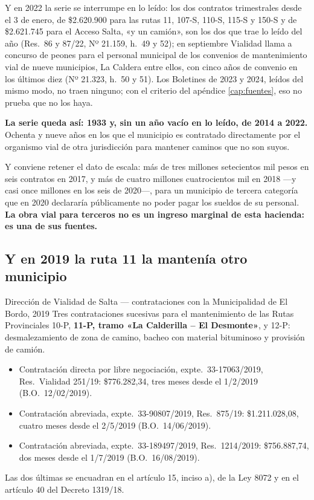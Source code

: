 Y en 2022 la serie se interrumpe en lo leído: los dos contratos trimestrales desde el 3 de enero, de \$2.620.900 para las rutas 11, 107-S, 110-S, 115-S y 150-S y de \$2.621.745 para el Acceso Salta, «y un camión», son los dos que trae lo leído del año (Res.\ 86 y 87/22, Nº 21.159, h.\ 49 y 52); en septiembre Vialidad llama a concurso de peones para el personal municipal de los convenios de mantenimiento vial de nueve municipios, La Caldera entre ellos, con cinco años de convenio en los últimos diez (Nº 21.323, h.\ 50 y 51). Los Boletines de 2023 y 2024, leídos del mismo modo, no traen ninguno; con el criterio del apéndice \ref{cap:fuentes}, eso no prueba que no los haya.

\textbf{La serie queda así: 1933 y, sin un año vacío en lo leído, de 2014 a 2022.} Ochenta y nueve años en los que el municipio
es contratado directamente por el organismo vial de otra jurisdicción para mantener caminos
que no son suyos.

Y conviene retener el dato de escala: más de tres millones setecientos mil pesos en seis contratos en 2017, y más de cuatro millones cuatrocientos mil en 2018 ---y casi once millones en los seis de 2020---, para un
municipio de tercera categoría que en 2020 declararía públicamente no poder pagar los
sueldos de su personal. \textbf{La obra vial para terceros no es un ingreso marginal de esta
hacienda: es una de sus fuentes.}

\subsection*{Y en 2019 la ruta 11 la mantenía otro municipio}

\begin{ficha}{Dirección de Vialidad de Salta --- contrataciones con la Municipalidad de El Bordo, 2019}
Tres contrataciones sucesivas para el mantenimiento de las Rutas Provinciales 10-P, \textbf{11-P, tramo «La Calderilla -- El Desmonte»}, y 12-P: desmalezamiento de zona de camino, bacheo con material bituminoso y provisión de camión.
\begin{itemize}[leftmargin=*,nosep]
\item Contratación directa por libre negociación, expte.\ 33-17063/2019, Res.\ Vialidad 251/19: \$776.282,34, tres meses desde el 1/2/2019 (B.O.\ 12/02/2019).
\item Contratación abreviada, expte.\ 33-90807/2019, Res.\ 875/19: \$1.211.028,08, cuatro meses desde el 2/5/2019 (B.O.\ 14/06/2019).
\item Contratación abreviada, expte.\ 33-189497/2019, Res.\ 1214/2019: \$756.887,74, dos meses desde el 1/7/2019 (B.O.\ 16/08/2019).
\end{itemize}
Las dos últimas se encuadran en el artículo 15, inciso a), de la Ley 8072 y en el artículo 40 del Decreto 1319/18.
\end{ficha}

